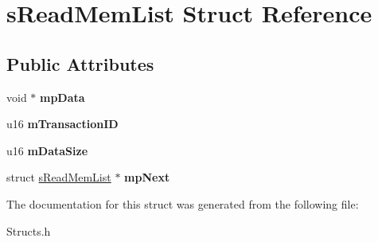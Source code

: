 \hypertarget{structsReadMemList}{\section{s\-Read\-Mem\-List \-Struct \-Reference}
\label{structsReadMemList}
}
\subsection*{\-Public \-Attributes}
\begin{DoxyCompactItemize}
\item 
\hypertarget{structsReadMemList_a40e38ecc34b891007a44359d6863c52c}{void $\ast$ {\bfseries mp\-Data}}\label{structsReadMemList_a40e38ecc34b891007a44359d6863c52c}

\item 
\hypertarget{structsReadMemList_a0b65d8639d7d5c13f5583a6d61e27771}{u16 {\bfseries m\-Transaction\-I\-D}}\label{structsReadMemList_a0b65d8639d7d5c13f5583a6d61e27771}

\item 
\hypertarget{structsReadMemList_a20e3a898286893e30e5ae1abd6d2e532}{u16 {\bfseries m\-Data\-Size}}\label{structsReadMemList_a20e3a898286893e30e5ae1abd6d2e532}

\item 
\hypertarget{structsReadMemList_af4f0ebc0b1b3de371f72981ed30b9bb2}{struct \hyperlink{structsReadMemList}{s\-Read\-Mem\-List} $\ast$ {\bfseries mp\-Next}}\label{structsReadMemList_af4f0ebc0b1b3de371f72981ed30b9bb2}

\end{DoxyCompactItemize}


\-The documentation for this struct was generated from the following file\-:\begin{DoxyCompactItemize}
\item 
\-Structs.\-h\end{DoxyCompactItemize}
